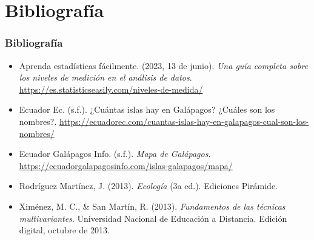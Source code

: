 \documentclass{beamer}
\begin{document}
	\section{Bibliografía}
	\begin{frame}[fragile]
		\frametitle{Bibliografía}
		\justifying
		\begin{itemize}
			\item Aprenda estadísticas fácilmente. (2023, 13 de junio). \textit{Una guía completa sobre los niveles de medición en el análisis de datos}. \url{https://es.statisticseasily.com/niveles-de-medida/}
			\item Ecuador Ec. (s.f.). ¿Cuántas islas hay en Galápagos? ¿Cuáles son los nombres?. \url{https://ecuadorec.com/cuantas-islas-hay-en-galapagos-cual-son-los-nombres/}
			\item Ecuador Galápagos Info. (s.f.). \textit{Mapa de Galápagos}. \url{https://ecuadorgalapagosinfo.com/islas-galapagos/mapa/}
			\item Rodríguez Martínez, J. (2013). \textit{Ecología} (3a ed.). Ediciones Pirámide.
			\item Ximénez, M. C., \& San Martín, R. (2013). \textit{Fundamentos de las técnicas multivariantes}. Universidad Nacional de Educación a Distancia. Edición digital, octubre de 2013.
		\end{itemize}
	\end{frame}
	
\end{document}
